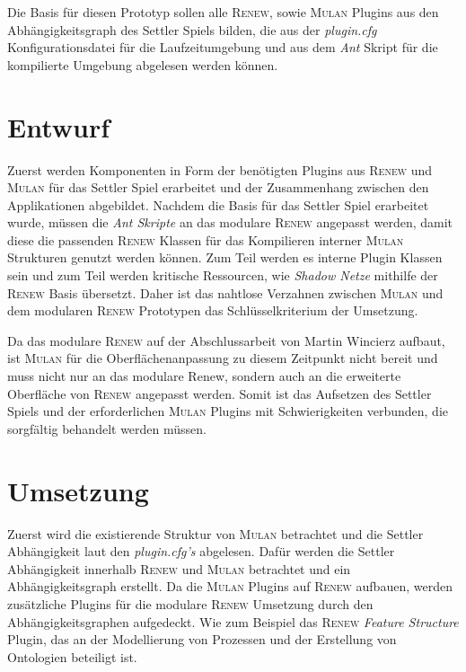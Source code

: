 	Die Basis für diesen Prototyp sollen alle \textsc{Renew}, sowie \textsc{Mulan} Plugins aus den Abhängigkeitsgraph des Settler Spiels bilden, die aus der \textit{plugin.cfg} Konfigurationsdatei für die Laufzeitumgebung und aus dem \textit{Ant} Skript für die kompilierte Umgebung abgelesen werden können.


\section{Entwurf}
	Zuerst werden Komponenten in Form der benötigten Plugins aus \textsc{Renew} und \textsc{Mulan} für das Settler Spiel erarbeitet und der Zusammenhang zwischen den Applikationen abgebildet.\bigbreak
	Nachdem die Basis für das Settler Spiel erarbeitet wurde, müssen die \textit{Ant Skripte} an das modulare \textsc{Renew} angepasst werden, damit diese die passenden \textsc{Renew} Klassen für das Kompilieren interner \textsc{Mulan} Strukturen genutzt werden können. Zum Teil werden es interne Plugin Klassen sein und zum Teil werden kritische Ressourcen, wie \textit{Shadow Netze} mithilfe der \textsc{Renew} Basis übersetzt. Daher ist das nahtlose Verzahnen zwischen \textsc{Mulan} und dem modularen \textsc{Renew} Prototypen das Schlüsselkriterium der Umsetzung. \bigbreak
	
	Da das modulare \textsc{Renew} auf der Abschlussarbeit von Martin Wincierz \cite{Wincierz18} aufbaut, ist \textsc{Mulan} für die Oberflächenanpassung zu diesem Zeitpunkt nicht bereit und muss nicht nur an das modulare Renew, sondern auch an die erweiterte Oberfläche von \textsc{Renew} angepasst werden.\newline
	Somit ist das Aufsetzen des Settler Spiels und der erforderlichen \textsc{Mulan} Plugins mit Schwierigkeiten verbunden, die sorgfältig behandelt werden müssen. 

\section{Umsetzung}
	Zuerst wird die existierende Struktur von \textsc{Mulan} betrachtet und die Settler Abhängigkeit laut den \textit{plugin.cfg's} abgelesen. Dafür werden die Settler Abhängigkeit innerhalb \textsc{Renew} und \textsc{Mulan} betrachtet und ein Abhängigkeitsgraph erstellt. Da die \textsc{Mulan} Plugins auf \textsc{Renew} aufbauen, werden zusätzliche Plugins für die modulare \textsc{Renew} Umsetzung durch den Abhängigkeitsgraphen aufgedeckt. Wie zum Beispiel das \textsc{Renew} \textit{Feature Structure} Plugin, das an der Modellierung von Prozessen und der Erstellung von Ontologien beteiligt ist. \bigbreak

